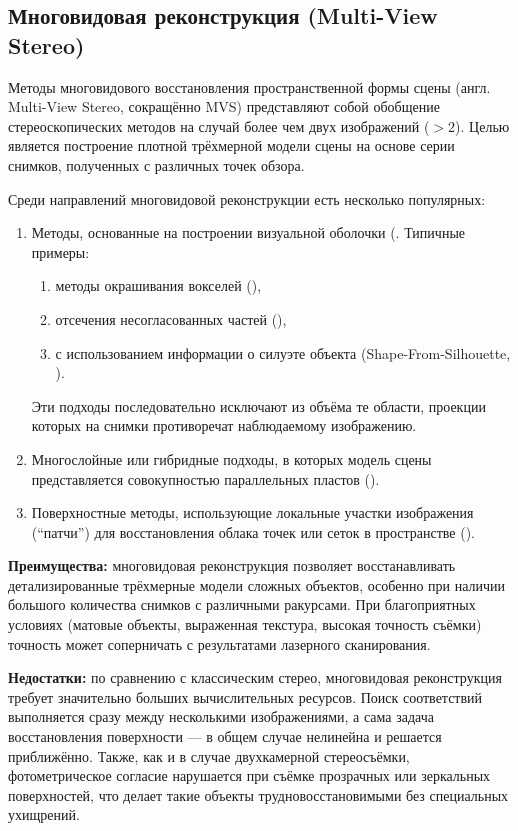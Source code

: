\subsection{Многовидовая реконструкция (Multi-View Stereo)}

Методы многовидового восстановления пространственной формы сцены (англ.
Multi-View Stereo, сокращённо MVS) представляют собой обобщение
стереоскопических методов на случай более чем двух изображений ($>2$). Целью
является построение плотной трёхмерной модели сцены на основе серии снимков,
полученных с различных точек обзора.

Среди направлений многовидовой реконструкции есть несколько популярных:

\begin{enumerate}
	\item Методы, основанные на построении визуальной оболочки (\cite{10.1109/34.273735}.
	Типичные примеры:
	\begin{enumerate}
		\item методы окрашивания вокселей (\cite{10.5555/794189.794361}),
		\item отсечения несогласованных частей (\cite{10.5555/898435}),
		\item с использованием информации о силуэте объекта (Shape-From-Silhouette, \cite{Matusik2002VHull}).
	\end{enumerate}
	Эти подходы последовательно исключают из объёма те области, проекции которых
	на снимки противоречат наблюдаемому изображению.

	\item Многослойные или гибридные подходы, в которых модель сцены
	представляется совокупностью параллельных пластов (\cite{10.1109/CVPR.1998.698642}).

	\item Поверхностные методы, использующие локальные участки изображения
	(``патчи'') для восстановления облака точек или сеток в пространстве (\cite{10.1109/CVPR.2007.383246}).

\end{enumerate}

\textbf{Преимущества:} многовидовая реконструкция позволяет восстанавливать
детализированные трёхмерные модели сложных объектов, особенно при наличии
большого количества снимков с различными ракурсами. При благоприятных условиях
(матовые объекты, выраженная текстура, высокая точность съёмки) точность может
соперничать с результатами лазерного сканирования.

\textbf{Недостатки:} по сравнению с классическим стерео, многовидовая
реконструкция требует значительно больших вычислительных ресурсов. Поиск
соответствий выполняется сразу между несколькими изображениями, а сама задача
восстановления поверхности — в общем случае нелинейна и решается приближённо.
Также, как и в случае двухкамерной стереосъёмки, фотометрическое согласие
нарушается при съёмке прозрачных или зеркальных поверхностей, что делает такие
объекты трудновосстановимыми без специальных ухищрений.

